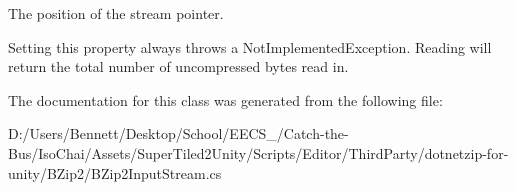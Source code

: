 The position of the stream pointer. 

Setting this property always throws a Not\+Implemented\+Exception. Reading will return the total number of uncompressed bytes read in. 

The documentation for this class was generated from the following file\+:\begin{DoxyCompactItemize}
\item 
D\+:/\+Users/\+Bennett/\+Desktop/\+School/\+E\+E\+C\+S\+\_/\+Catch-\/the-\/\+Bus/\+Iso\+Chai/\+Assets/\+Super\+Tiled2\+Unity/\+Scripts/\+Editor/\+Third\+Party/dotnetzip-\/for-\/unity/\+B\+Zip2/B\+Zip2\+Input\+Stream.\+cs\end{DoxyCompactItemize}
